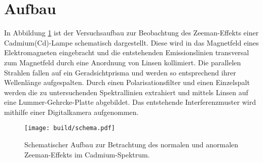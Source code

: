 \section{Aufbau}
\label{sec:Aufbau}

In Abbildung \ref{fig:schema} ist der Versuchsaufbau zur Beobachtung des Zeeman-Effekts einer Cadmium(Cd)-Lampe schematisch dargestellt.
Diese wird in das Magnetfeld eines Elektromagneten eingebracht und die entstehenden Emissionslinien transversal zum Magnetfeld durch eine Anordnung von Linsen kollimiert. Die parallelen Strahlen fallen auf ein Geradsichtprisma und werden so entsprechend ihrer Wellenlänge aufgespalten. Durch einen Polarisationsfilter und einen Einzelspalt werden die zu untersuchenden Spektrallinien extrahiert und mittels Linsen auf eine Lummer-Gehrcke-Platte abgebildet. Das entstehende Interferenzmuster wird mithilfe einer Digitalkamera aufgenommen.

\begin{figure}
\centering
\texttt{[image: build/schema.pdf]}
\caption{Schematischer Aufbau zur Betrachtung des normalen und anormalen Zeeman-Effekts im Cadmium-Spektrum.\cite{V27}}
\label{fig:schema}
\end{figure}

